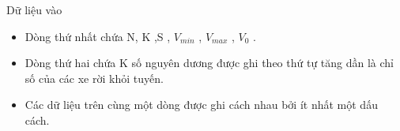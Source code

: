Dữ liệu vào
\begin{itemize}
	\item     Dòng thứ nhất chứa N, K ,S , $V_{min}$    , $V_{max}$    , $V_{0}$    .   
	\item     Dòng thứ hai chứa K số nguyên dương được ghi theo thứ tự tăng dần là chỉ số của các xe rời khỏi tuyến.   
	\item     Các dữ liệu trên cùng một dòng được ghi cách nhau bởi ít nhất một dấu cách.   
\end{itemize}